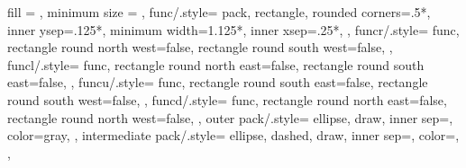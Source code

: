 {{  	fill = \picolor,
  	minimum size = \psize
  },
  func/.style={
  	pack,
		rectangle,
		rounded corners=.5*\psize,
		inner ysep=.125*\psize,
		minimum width=1.125*\psize,
		inner xsep=.25*\psize,
  },
  funcr/.style={
    func,
    rectangle round north west=false, 
		rectangle round south west=false,
  },
  funcl/.style={
    func,
		rectangle round north east=false, 
		rectangle round south east=false,
  },
  funcu/.style={
    func,
		rectangle round south east=false, 
		rectangle round south west=false,
  },
  funcd/.style={
    func,
		rectangle round north east=false, 
		rectangle round north west=false,
  },
  outer pack/.style={
 		ellipse, 
 		draw,
  	inner sep=\ssep,
  	color=gray,
 	},
  intermediate pack/.style={
 		ellipse,
 		dashed, 
  	draw,
  	inner sep=\ssep,
 		color=\pocolor,
 	},
 }
 


